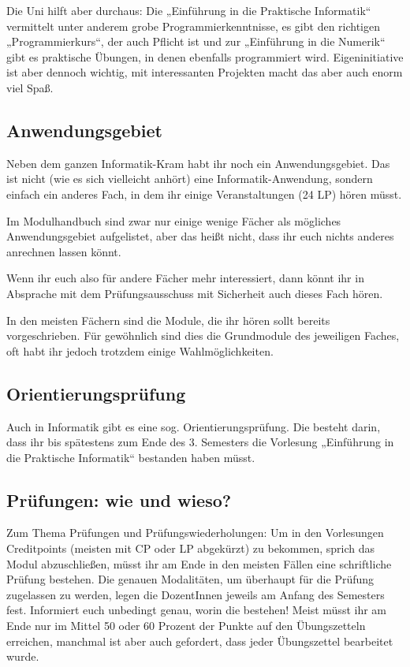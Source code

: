 Die Uni hilft aber durchaus: Die „Einführung in die Praktische Informatik“ vermittelt unter anderem grobe Programmierkenntnisse, es gibt den richtigen „Programmierkurs“, der auch Pflicht ist und zur „Einführung in die Numerik“ gibt es praktische Übungen, in denen ebenfalls programmiert wird. Eigeninitiative ist aber dennoch wichtig, mit interessanten Projekten macht das aber auch enorm viel Spaß.


\subsection{Anwendungsgebiet}

Neben dem ganzen Informatik-Kram habt ihr noch ein Anwendungsgebiet. Das ist nicht (wie es sich vielleicht anhört) eine Informatik-Anwendung, sondern einfach ein anderes Fach, in dem ihr einige Veranstaltungen (24 \gls{LP}) hören müsst.

Im Modulhandbuch sind zwar nur einige wenige Fächer als mögliches Anwendungsgebiet aufgelistet, aber das heißt nicht, dass ihr euch nichts anderes anrechnen lassen könnt.

Wenn ihr euch also für andere Fächer mehr interessiert, dann könnt ihr in Absprache mit dem Prüfungsausschuss mit Sicherheit auch dieses Fach hören.

In den meisten Fächern sind die Module, die ihr hören sollt bereits vorgeschrieben. Für gewöhnlich sind dies die Grundmodule des jeweiligen Faches, oft habt ihr jedoch trotzdem einige Wahlmöglichkeiten.


\subsection{Orientierungsprüfung}

Auch in Informatik gibt es eine sog. Orientierungsprüfung. Die besteht darin, dass ihr bis spätestens zum Ende des 3. Semesters die Vorlesung „Einführung in die Praktische Informatik“ bestanden haben müsst.


\subsection{Prüfungen: wie und wieso?}

Zum Thema Prüfungen und Prüfungswiederholungen: Um in den Vorlesungen Creditpoints (meisten mit \gls{CP} oder \gls{LP} abgekürzt) zu bekommen, sprich das Modul abzuschließen, müsst ihr am Ende in den meisten Fällen eine schriftliche Prüfung bestehen. Die genauen Modalitäten, um überhaupt für die Prüfung zugelassen zu werden, legen die DozentInnen jeweils am Anfang des Semesters fest. Informiert euch unbedingt genau, worin die bestehen! Meist müsst ihr am Ende nur im Mittel 50 oder 60 Prozent der Punkte auf den Übungszetteln erreichen, manchmal ist aber auch gefordert, dass jeder Übungszettel bearbeitet wurde.


